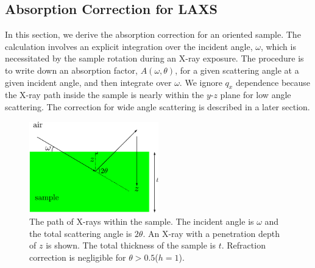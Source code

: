 \subsection{Absorption Correction for LAXS}\label{sec:absorption_correction}
In this section, we derive the absorption correction for an oriented sample. 
The calculation involves an explicit integration over the incident angle, 
$\omega$, which is necessitated by the sample rotation during an X-ray exposure. 
The procedure is to write down an absorption factor, $A(\omega,\theta)$, for a 
given scattering angle at a given incident angle, and
then integrate over $\omega$. We ignore $q_x$ dependence because the X-ray
path inside the sample is nearly within the $y$-$z$ plane for low angle
scattering. The correction for wide angle scattering is described in a later
section.

\begin{figure}[htbp]
  \centering
  \includegraphics[width=0.5\textwidth]{figures/ripple/analysis/absorption_LAXS}
  \caption{The path of X-rays within the sample. The incident angle is 
  $\omega$ and the total scattering angle is $2\theta$. An X-ray with a
  penetration depth of $z$ is shown. The total thickness of the sample
  is $t$. Refraction correction is negligible for 
  $\theta > 0.5$\textdegree ($h=1$).}
  \label{fig:absorption_LAXS}
\end{figure}

